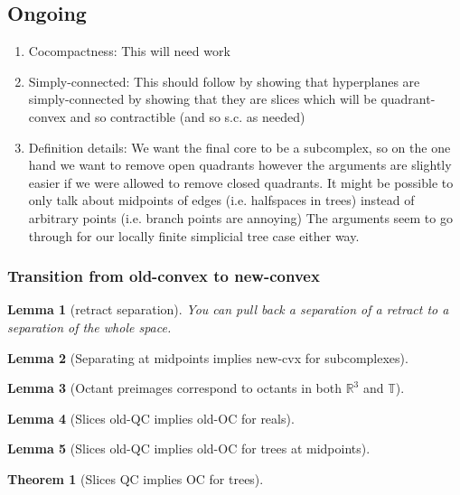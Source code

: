 \documentclass{article}
\theoremstyle{mystyle}
\newtheorem{thm}{Theorem}[section]
\newtheorem{lem}{Lemma}[section]
\theoremstyle{remark}
\begin{document}
\subsection{Ongoing}
\begin{enumerate}
    \item Cocompactness: This will need work
    \item Simply-connected: This should follow by showing that hyperplanes are simply-connected by showing that they are slices which will be quadrant-convex and so contractible (and so s.c. as needed)
    \item Definition details: We want the final core to be a subcomplex, so on the one hand we want to remove open quadrants however the arguments are slightly easier if we were allowed to remove closed quadrants. It might be possible to only talk about midpoints of edges (i.e. halfspaces in trees) instead of arbitrary points (i.e. branch points are annoying) The arguments seem to go through for our locally finite simplicial tree case either way. 
\end{enumerate}

\subsubsection{Transition from old-convex to new-convex}

\begin{lem}
    [retract separation]
    You can pull back a separation of a retract to a separation of the whole space.
\end{lem}
\begin{lem}
    [Separating at midpoints implies new-cvx for subcomplexes]
\end{lem}
\begin{lem}
    [Octant preimages correspond to octants in both \(\mathbb{R}^3\) and \(\mathbb{T}\)]
\end{lem}
\begin{lem}
    [Slices old-QC implies old-OC for reals]
\end{lem}
\begin{lem}
    [Slices old-QC implies old-OC for trees at midpoints]
\end{lem}
\begin{thm}
    [Slices QC implies OC for trees]
\end{thm}
\end{document}
